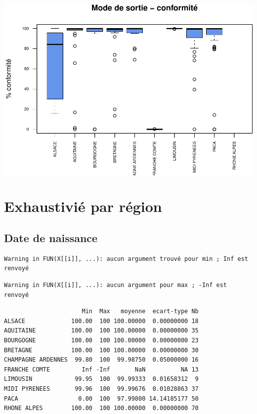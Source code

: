 \documentclass[]{article}
\begin{document}
\includegraphics{septembre2015_files/figure-latex/unnamed-chunk-27-1.pdf}

\section{Exhaustivié par région}\label{exhaustivie-par-region}

\subsection{Date de naissance}\label{date-de-naissance-2}

\begin{verbatim}
Warning in FUN(X[[i]], ...): aucun argument trouvé pour min ; Inf est
renvoyé
\end{verbatim}

\begin{verbatim}
Warning in FUN(X[[i]], ...): aucun argument pour max ; -Inf est renvoyé
\end{verbatim}

\begin{verbatim}
                      Min  Max   moyenne  ecart-type Nb
ALSACE             100.00  100 100.00000  0.00000000 18
AQUITAINE          100.00  100 100.00000  0.00000000 35
BOURGOGNE          100.00  100 100.00000  0.00000000 23
BRETAGNE           100.00  100 100.00000  0.00000000 30
CHAMPAGNE ARDENNES  99.80  100  99.98750  0.05000000 16
FRANCHE COMTE         Inf -Inf       NaN          NA 13
LIMOUSIN            99.95  100  99.99333  0.01658312  9
MIDI PYRENEES       99.96  100  99.99676  0.01028863 37
PACA                 0.00  100  97.99800 14.14185177 50
RHONE ALPES        100.00  100 100.00000  0.00000000 70
\end{verbatim}
\end{document}
